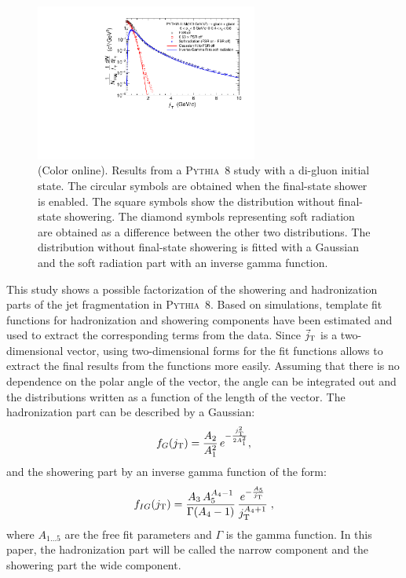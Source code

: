   \begin{figure}
    \begin{center}
      \includegraphics[width = 0.65\textwidth]{figures/pythia_fitComponents_updatedDetails_ptt=6v0-8v0_xe=0v4-0v6}
    \end{center}
    \caption{(Color online). Results from a \textsc{Pythia}~8 study with a di-gluon initial state. The circular symbols are obtained when the final-state shower is enabled. The square symbols show the distribution without final-state showering. The diamond symbols representing soft radiation are obtained as a difference between the other two distributions. The distribution without final-state showering is fitted with a Gaussian and the soft radiation part with an inverse gamma function.}
    \label{fig:componentsFromResonance}
  \end{figure}  
  
This study shows a possible factorization of the showering and hadronization parts of the jet fragmentation in \textsc{Pythia}~8. Based on simulations, template fit functions for hadronization and showering components have been estimated and used to extract the corresponding terms from the data. Since $\vec{j}_{\rm T}$ is a two-dimensional vector, using two-dimensional forms for the fit functions allows to extract the final results from the functions more easily. Assuming that there is no dependence on the polar angle of the vector, the angle can be integrated out and the distributions written as a function of the length of the vector. The hadronization part can be described by a Gaussian:
\begin{equation}
f_{G}(j_{\rm T}) = \frac{A_{2}}{A_{1}^{2}} \, e^{-\frac{j_{\rm T}^{2}}{2 A_{1}^{2}}},
\label{eq:gauss}
\end{equation}
and the showering part by an inverse gamma function of the form:
\begin{equation}
f_{IG}(j_{\rm T}) = \frac{A_{3} \, A_{5}^{A_{4}-1}}{\Gamma(A_{4}-1)} \, \frac{e^{-\frac{A_{5}}{j_{\rm T}}}}{j_{\rm T}^{A_{4}+1}}\;,
\label{eq:inverseGamma}
\end{equation}  
where $A_{1\ldots5}$ are the free fit parameters and $\Gamma$ is the gamma function. In this paper, the hadronization part will be called the narrow component and the showering part the wide component.
  
